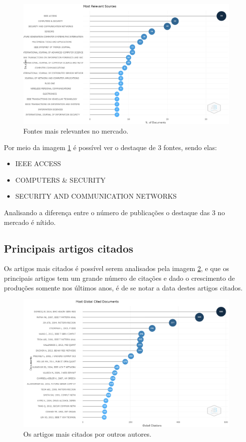 \begin{figure}
    \centering
    \includegraphics[width=1\textwidth]{experiments/AllannH/PesquisaBibliometrica/Imagens/TSW-AllannH-fontes_relevantes.png}
    \caption{Fontes mais relevantes no mercado.}
    \label{fig:AllannH-fontes_relevantes}
\end{figure}
Por meio da imagem \ref{fig:AllannH-fontes_relevantes} é possível ver o destaque de 3 fontes, sendo elas:
\begin{itemize}
\item IEEE ACCESS
\item COMPUTERS \& SECURITY
\item SECURITY AND COMMUNICATION NETWORKS
\end{itemize}
Analisando a diferença entre o número de publicações o destaque das 3 no mercado é nítido.

\subsection{Principais artigos citados}
Os artigos mais citados é possível serem analisados pela imagem \ref{fig:AllannH-artigos_citados}, e que os principais artigos tem um grande número de citações e dado o crescimento de produções somente nos últimos anos, é de se notar a data destes artigos citados.

\begin{figure}
    \centering
    \includegraphics[width=1\textwidth]{experiments/AllannH/PesquisaBibliometrica/Imagens/TSW-AllannH-artigos_citados.png}
    \caption{Os artigos mais citados por outros autores.}
    \label{fig:AllannH-artigos_citados}
\end{figure}

